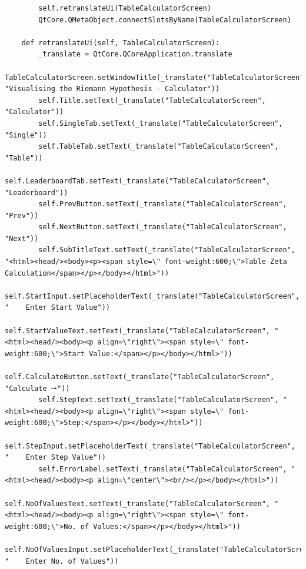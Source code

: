 \documentclass[12pt]{article}
\begin{document}
\begin{lstlisting}
        self.retranslateUi(TableCalculatorScreen)
        QtCore.QMetaObject.connectSlotsByName(TableCalculatorScreen)

    def retranslateUi(self, TableCalculatorScreen):
        _translate = QtCore.QCoreApplication.translate
        TableCalculatorScreen.setWindowTitle(_translate("TableCalculatorScreen", "Visualising the Riemann Hypothesis - Calculator"))
        self.Title.setText(_translate("TableCalculatorScreen", "Calculator"))
        self.SingleTab.setText(_translate("TableCalculatorScreen", "Single"))
        self.TableTab.setText(_translate("TableCalculatorScreen", "Table"))
        self.LeaderboardTab.setText(_translate("TableCalculatorScreen", "Leaderboard"))
        self.PrevButton.setText(_translate("TableCalculatorScreen", "Prev"))
        self.NextButton.setText(_translate("TableCalculatorScreen", "Next"))
        self.SubTitleText.setText(_translate("TableCalculatorScreen", "<html><head/><body><p><span style=\" font-weight:600;\">Table Zeta Calculation</span></p></body></html>"))
        self.StartInput.setPlaceholderText(_translate("TableCalculatorScreen", "    Enter Start Value"))
        self.StartValueText.setText(_translate("TableCalculatorScreen", "<html><head/><body><p align=\"right\"><span style=\" font-weight:600;\">Start Value:</span></p></body></html>"))
        self.CalculateButton.setText(_translate("TableCalculatorScreen", "Calculate 🠖"))
        self.StepText.setText(_translate("TableCalculatorScreen", "<html><head/><body><p align=\"right\"><span style=\" font-weight:600;\">Step:</span></p></body></html>"))
        self.StepInput.setPlaceholderText(_translate("TableCalculatorScreen", "    Enter Step Value"))
        self.ErrorLabel.setText(_translate("TableCalculatorScreen", "<html><head/><body><p align=\"center\"><br/></p></body></html>"))
        self.NoOfValuesText.setText(_translate("TableCalculatorScreen", "<html><head/><body><p align=\"right\"><span style=\" font-weight:600;\">No. of Values:</span></p></body></html>"))
        self.NoOfValuesInput.setPlaceholderText(_translate("TableCalculatorScreen", "    Enter No. of Values"))
\end{lstlisting}
\end{document}
